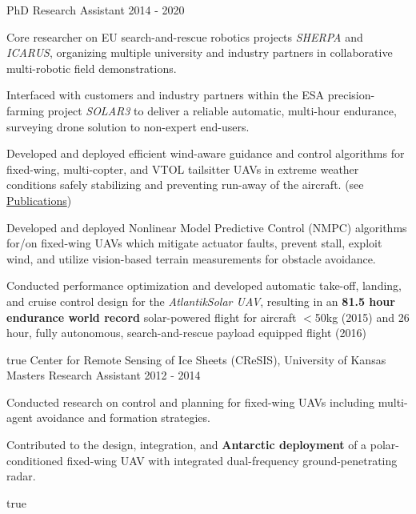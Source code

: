 \begin{cventries}
  	{PhD Research Assistant} %
    {} %
    {2014 - 2020} %
    {
      \begin{cvitems} %
      	\item Core researcher on EU search-and-rescue robotics projects \emph{SHERPA} and \emph{ICARUS}, organizing multiple university and industry partners in collaborative multi-robotic field demonstrations. 
      	\item Interfaced with customers and industry partners within the ESA precision-farming project \emph{SOLAR3} to deliver a reliable automatic, multi-hour endurance, surveying drone solution to non-expert end-users.
      	\item Developed and deployed efficient wind-aware guidance and control algorithms for fixed-wing, multi-copter, and VTOL tailsitter UAVs in extreme weather conditions safely stabilizing and preventing run-away of the aircraft. (see \hyperref[sec:pub]{\color{awesome}Publications})
      	\item Developed and deployed Nonlinear Model Predictive Control (NMPC) algorithms for/on fixed-wing UAVs which mitigate actuator faults, prevent stall, exploit wind, and utilize vision-based terrain measurements for obstacle avoidance.
		\item Conducted performance optimization and developed automatic take-off, landing, and cruise control design for the \emph{AtlantikSolar UAV}, resulting in an \textbf{81.5 hour endurance world record} solar-powered flight for aircraft $<$50kg (2015)  and 26 hour, fully autonomous, search-and-rescue payload equipped flight (2016) 
      \end{cvitems}
    } %
    {} %
    {true}
    {}
%   
\cvexpentry
  	{Center for Remote Sensing of Ice Sheets (CReSIS), University of Kansas} %
  	{Masters Research Assistant} %
    {} %
    {2012 - 2014} %
    {
      \begin{cvitems} %
      	\item Conducted research on control and planning for fixed-wing UAVs including multi-agent avoidance and formation strategies.
      	\item Contributed to the design, integration, and \textbf{Antarctic deployment} of a polar-conditioned fixed-wing UAV with integrated dual-frequency ground-penetrating radar.
      \end{cvitems}
    } %
    {} %
    {true}
    {}
\end{cventries}
